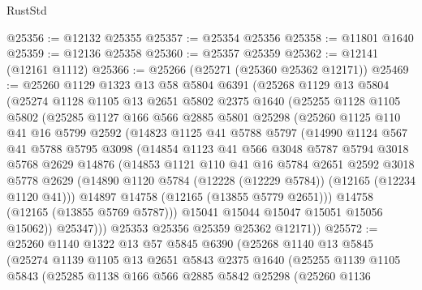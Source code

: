 \begin{lexlean}{RustStd}
\begin{coremodule}
@25356 := @12132 @25355
@25357 := @25354 @25356
@25358 := @11801 @1640
@25359 := @12136 @25358
@25360 := @25357 @25359
@25362 := @12141 (@12161 @1112)
@25366 := @25266 (@25271 (@25360 @25362 @12171))
@25469 := @25260
    @1129
    @1323
    @13
    @58
    @5804
    @6391
    (@25268
      @1129
      @13
      @5804
      (@25274
        @1128
        @1105
        @13
        @2651
        @5802
        @2375
        @1640
        (@25255
          @1128
          @1105
          @5802
          (@25285
            @1127
            @166
            @566
            @2885
            @5801
            @25298
            (@25260
              @1125
              @110
              @41
              @16
              @5799
              @2592
              (@14823
                @1125
                @41
                @5788
                @5797
                (@14990
                  @1124
                  @567
                  @41
                  @5788
                  @5795
                  @3098
                  (@14854
                    @1123
                    @41
                    @566
                    @3048
                    @5787
                    @5794
                    @3018
                    @5768
                    @2629
                    @14876
                    (@14853
                      @1121
                      @110
                      @41
                      @16
                      @5784
                      @2651
                      @2592
                      @3018
                      @5778
                      @2629
                      (@14890 @1120 @5784 (@12228 (@12229 @5784)) (@12165 (@12234 @1120 @41)))
                      @14897
                      @14758
                      (@12165 (@13855 @5779 @2651)))
                    @14758
                    (@12165 (@13855 @5769 @5787)))
                  @15041
                  @15044
                  @15047
                  @15051
                  @15056
                  @15062))
              @25347)))
        @25353
        @25356
        @25359
        @25362
        @12171))
@25572 := @25260
    @1140
    @1322
    @13
    @57
    @5845
    @6390
    (@25268
      @1140
      @13
      @5845
      (@25274
        @1139
        @1105
        @13
        @2651
        @5843
        @2375
        @1640
        (@25255
          @1139
          @1105
          @5843
          (@25285
            @1138
            @166
            @566
            @2885
            @5842
            @25298
            (@25260
              @1136

\end{coremodule}
\end{lexlean}
